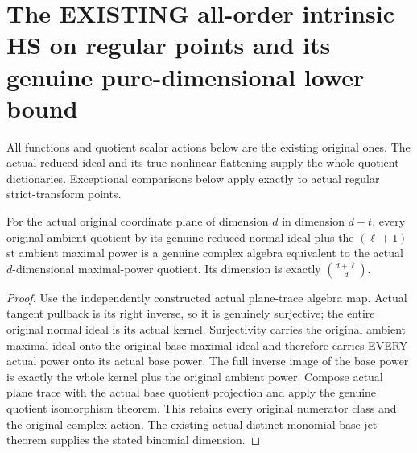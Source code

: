 \section{The EXISTING all-order intrinsic HS on regular points and its genuine pure-dimensional lower bound}

All functions and quotient scalar actions below are the existing original
ones. The actual reduced ideal and its true nonlinear flattening supply
the whole quotient dictionaries. Exceptional comparisons below apply
exactly to actual regular strict-transform points.

\begin{lemma}
\label{hir:actual-plane-reduced-ambient-jet-quotient}
\leanok
For the actual original coordinate plane of dimension $d$ in dimension
$d+t$, every original ambient quotient by its genuine reduced normal
ideal plus the $(\ell+1)$st ambient maximal power is a genuine complex
algebra equivalent to the actual $d$-dimensional maximal-power quotient.
Its dimension is exactly $\binom{d+\ell}{d}$.
\end{lemma}
\begin{proof}
Use the independently constructed actual plane-trace algebra map. Actual
tangent pullback is its right inverse, so it is genuinely surjective;
the entire original normal ideal is its actual kernel. Surjectivity
carries the original ambient maximal ideal onto the original base
maximal ideal and therefore carries EVERY actual power onto its actual
base power. The full inverse image of the base power is exactly the
whole kernel plus the original ambient power. Compose actual plane trace
with the actual base quotient projection and apply the genuine quotient
isomorphism theorem. This retains every original numerator class and
the original complex action. The existing actual distinct-monomial
base-jet theorem supplies the stated binomial dimension.
\end{proof}

